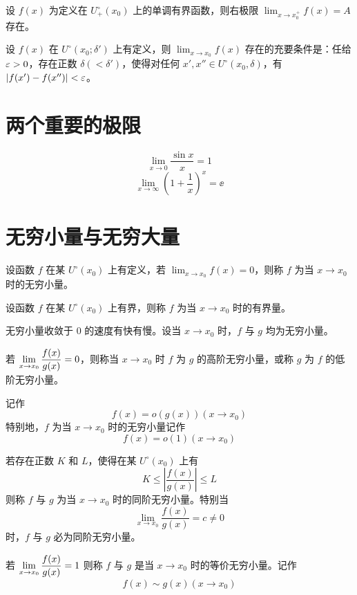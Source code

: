 \begin{theorem}
    设 $f(x)$ 为定义在 $U_+^\circ(x_0)$ 上的单调有界函数，则右极限 $\displaystyle\lim_{x\to x_0^+}f(x)=A$ 存在。
\end{theorem}

\begin{theorem}[Cauchy 准则]
    设 $f(x)$ 在 $U^\circ(x_0;\delta')$ 上有定义，则 $\displaystyle\lim_{x\to x_0}f(x)$ 存在的充要条件是：任给 $\varepsilon > 0$，存在正数 $\delta(<\delta')$，使得对任何 $x',x''\in U^\circ(x_0,\delta)$，有 $|f(x')-f(x'')|<\varepsilon$。
\end{theorem}

\section{两个重要的极限}

$$\lim_{x\to 0}\frac{\sin x}{x} = 1$$
$$\lim_{x\to \infty}\left(1+\frac{1}{x}\right)^x = \ee$$

\section{无穷小量与无穷大量}

\begin{definition}[无穷小量]
    设函数 $f$ 在某 $U^\circ(x_0)$ 上有定义，若 $\displaystyle\lim_{x\to x_0}f(x)=0$，则称 $f$ 为当 $x\to x_0$ 时的无穷小量。
\end{definition}

\begin{definition}[有界量]
    设函数 $f$ 在某 $U^\circ(x_0)$ 上有界，则称 $f$ 为当 $x\to x_0$ 时的有界量。
\end{definition}

无穷小量收敛于 $0$ 的速度有快有慢。设当 $x\to x_0$ 时，$f$ 与 $g$ 均为无穷小量。

若 $\displaystyle\lim_{x\to x_0}\mfrac{f(x)}{g(x)} = 0$，则称当 $x\to x_0$ 时 $f$ 为 $g$ 的高阶无穷小量，或称 $g$ 为 $f$ 的低阶无穷小量。

记作
$$f(x)=o(g(x))(x\to x_0)$$
特别地，$f$ 为当 $x\to x_0$ 时的无穷小量记作
$$f(x)=o(1)(x\to x_0)$$

若存在正数 $K$ 和 $L$，使得在某 $U^\circ(x_0)$ 上有
$$K\leqslant \left|\frac{f(x)}{g(x)}\right| \leqslant L$$
则称 $f$ 与 $g$ 为当 $x\to x_0$ 时的同阶无穷小量。特别当
$$\lim_{x\to x_0}\frac{f(x)}{g(x)} = c \ne 0$$
时，$f$ 与 $g$ 必为同阶无穷小量。

若 $\displaystyle\lim_{x\to x_0}\mfrac{f(x)}{g(x)} = 1$ 则称 $f$ 与 $g$ 是当 $x\to x_0$ 时的等价无穷小量。记作
$$f(x) \sim g(x) (x\to x_0)$$

